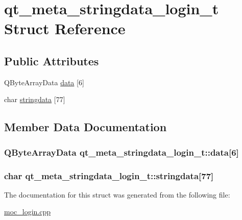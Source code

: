 \hypertarget{structqt__meta__stringdata__login__t}{\section{qt\-\_\-meta\-\_\-stringdata\-\_\-login\-\_\-t Struct Reference}
\label{structqt__meta__stringdata__login__t}
}
\subsection*{Public Attributes}
\begin{DoxyCompactItemize}
\item 
Q\-Byte\-Array\-Data \hyperlink{structqt__meta__stringdata__login__t_ab501ecd1d2076ad1bab25d18f9d33413}{data} \mbox{[}6\mbox{]}
\item 
char \hyperlink{structqt__meta__stringdata__login__t_a2a215d186853ceb6bb6dd05fe7cbedef}{stringdata} \mbox{[}77\mbox{]}
\end{DoxyCompactItemize}


\subsection{Member Data Documentation}
\hypertarget{structqt__meta__stringdata__login__t_ab501ecd1d2076ad1bab25d18f9d33413}{
\subsubsection[{data}]{\setlength{\rightskip}{0pt plus 5cm}Q\-Byte\-Array\-Data qt\-\_\-meta\-\_\-stringdata\-\_\-login\-\_\-t\-::data\mbox{[}6\mbox{]}}}\label{structqt__meta__stringdata__login__t_ab501ecd1d2076ad1bab25d18f9d33413}
\hypertarget{structqt__meta__stringdata__login__t_a2a215d186853ceb6bb6dd05fe7cbedef}{
\subsubsection[{stringdata}]{\setlength{\rightskip}{0pt plus 5cm}char qt\-\_\-meta\-\_\-stringdata\-\_\-login\-\_\-t\-::stringdata\mbox{[}77\mbox{]}}}\label{structqt__meta__stringdata__login__t_a2a215d186853ceb6bb6dd05fe7cbedef}


The documentation for this struct was generated from the following file\-:\begin{DoxyCompactItemize}
\item 
\hyperlink{moc__login_8cpp}{moc\-\_\-login.\-cpp}\end{DoxyCompactItemize}
